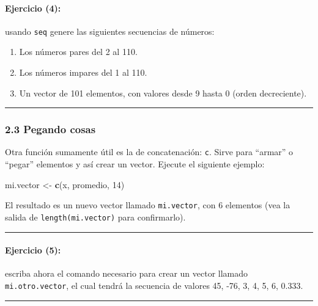 \documentclass[]{article}
\newenvironment{Shaded}{}{}
\newcommand{\KeywordTok}[1]{\textcolor[rgb]{0.00,0.44,0.13}{\textbf{{#1}}}}
\newcommand{\DecValTok}[1]{\textcolor[rgb]{0.25,0.63,0.44}{{#1}}}
\newcommand{\NormalTok}[1]{{#1}}
\begin{document}
\paragraph{Ejercicio (4):}

usando \texttt{seq} genere las siguientes secuencias de números:

\begin{enumerate}[1.]
\item
  Los números pares del 2 al 110.
\item
  Los números impares del 1 al 110.
\item
  Un vector de 101 elementos, con valores desde 9 hasta 0 (orden
  decreciente).
\end{enumerate}
\begin{center}\rule{3in}{0.4pt}\end{center}

\subsubsection{2.3 Pegando cosas}

Otra función sumamente útil es la de concatenación: \texttt{c}. Sirve
para ``armar'' o ``pegar'' elementos y así crear un vector. Ejecute el
siguiente ejemplo:

\begin{Shaded}
\begin{Highlighting}[]
\NormalTok{mi.vector <- }\KeywordTok{c}\NormalTok{(x, promedio, }\DecValTok{14}\NormalTok{)}
\end{Highlighting}
\end{Shaded}
El resultado es un nuevo vector llamado \texttt{mi.vector}, con 6
elementos (vea la salida de \texttt{length(mi.vector)} para
confirmarlo).

\begin{center}\rule{3in}{0.4pt}\end{center}

\paragraph{Ejercicio (5):}

escriba ahora el comando necesario para crear un vector llamado
\texttt{mi.otro.vector}, el cual tendrá la secuencia de valores 45, -76,
3, 4, 5, 6, 0.333.

\begin{center}\rule{3in}{0.4pt}\end{center}
\end{document}
